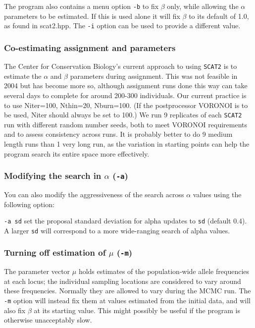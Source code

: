 \documentclass[10pt,titlepage,times,letterpaper]{article}
\def\SCAT{{\tt SCAT2} }
\begin{document}
The program also contains a menu option {\tt -b} to fix $\beta$ only,
while allowing the $\alpha$ parameters to be estimated.  If this is
used alone it will fix $\beta$ to its default of 1.0, as found in
scat2.hpp.  The {\tt -i} option can be used to provide a different
value. 

\subsubsection{Co-estimating assignment and parameters}

The Center for Conservation Biology's current approach
to using \SCAT is to estimate the $\alpha$ and $\beta$ parameters during
assignment.  This was not feasible in 2004 but has become more so, although
assignment runs done this way can take several days to complete for around
200-300 individuals.  Our current practice is to use Niter=100, Nthin=20,
Nburn=100.  (If the postprocessor VORONOI is to be used, Niter should
always be set to 100.)  We run 9 replicates of each \SCAT run with
different random number seeds, both to meet VORONOI requirements and
to assess consistency across runs.  It is probably better to do 9
medium length runs than 1 very long run, as the variation in starting
points can help the program search its entire space more effectively.

\subsubsection{Modifying the search in $\alpha$  ({\tt -a})}

You can also modify the aggressiveness of the search across $\alpha$
values using the following option:

{\tt -a sd} set the proposal standard deviation for alpha updates to
{\tt sd} (default 0.4).  A larger {\tt sd} will correspond to a more
wide-ranging search of alpha values.

\subsubsection{Turning off estimation of $\mu$ ({\tt -m})}

The parameter vector $\mu$ holds estimates of the population-wide
allele frequencies at each locus; the individual sampling locations
are considered to vary around these frequencies.  Normally they
are allowed to vary during the MCMC run.  The {\tt -m} option
will instead fix them at values estimated from the initial data,
and will also fix $\beta$ at its starting value.
This might possibly be useful if the program is otherwise
unacceptably slow.
\end{document}
